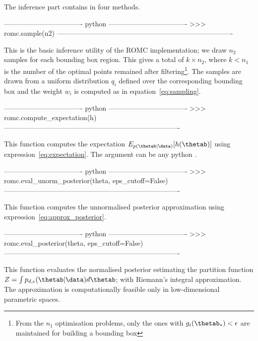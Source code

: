 The inference part contains in four methods.

\begin{Code}
---------------------------------- python ----------------------------------
>>> romc.sample(n2)
----------------------------------------------------------------------------
\end{Code}

\noindent
This is the basic inference utility of the ROMC implementation; we
draw $n_2$ samples for each bounding box region. This gives a total of
$k \times n_2$, where $k < n_1$ is the number of the optimal points
remained after filtering\footnote{From the $n_1$ optimisation
  problems, only the ones with $g_i(\thetab_*) < \epsilon$ are
  maintained for building a bounding box}. The samples are drawn from
a uniform distribution $q_i$ defined over the corresponding bounding
box and the weight $w_i$ is computed as in
equation~\eqref{eq:sampling}.

\begin{Code}
---------------------------------- python ----------------------------------
>>> romc.compute_expectation(h)
----------------------------------------------------------------------------
\end{Code}

\noindent
This function computes the expectation
$E_{p(\thetab|\data)}[h(\thetab)]$ using
expression~\eqref{eq:expectation}. The argument  can be
any python .

\begin{Code}
---------------------------------- python ----------------------------------
>>> romc.eval_unorm_posterior(theta, eps_cutoff=False)
----------------------------------------------------------------------------
\end{Code}

\noindent
This function computes the unnormalised posterior approximation using
expression~\eqref{eq:approx_posterior}.

\begin{Code}
---------------------------------- python ----------------------------------
>>> romc.eval_posterior(theta, eps_cutoff=False)
----------------------------------------------------------------------------
\end{Code}

\noindent
This function evaluates the normalised posterior estimating the
partition function $Z = \int p_{d,\epsilon}(\thetab|\data)d\thetab$;
with Riemann's integral approximation. The approximation is
computationally feasible only in low-dimensional parametric
spaces.

